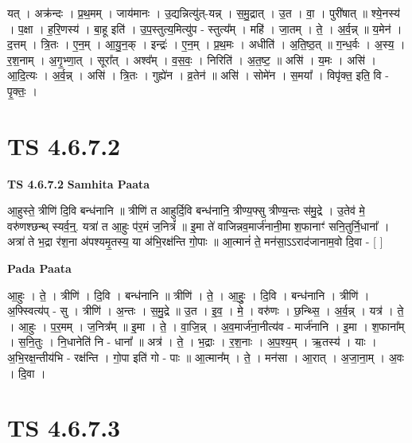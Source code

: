 \documentclass[17pt]{extarticle}
\begin{document}
यत् । अक्र॑न्दः । प्र॒थ॒मम् । जाय॑मानः । उ॒द्यन्नित्यु॑त्-यन्न् । स॒मु॒द्रात् । उ॒त । वा॒ । पुरी॑षात् ॥ श्ये॒नस्य॑ । प॒क्षा । ह॒रि॒णस्य॑ । बा॒हू इति॑ । उ॒प॒स्तुत्य॒मित्यु॑प - स्तुत्य᳚म् । महि॑ । जा॒तम् । ते॒ । अ॒र्व॒न्न् ॥ य॒मेन॑ । द॒त्तम् । त्रि॒तः । ए॒न॒म् । आ॒यु॒न॒क् । इन्द्रः॑ । ए॒न॒म् । प्र॒थ॒मः । अधीति॑ । अ॒ति॒ष्ठ॒त् ॥ ग॒न्ध॒र्वः । अ॒स्य॒ । र॒श॒नाम् । अ॒गृ॒भ्णा॒त् । सूरा᳚त् । अश्व᳚म् । व॒स॒वः॒ । निरिति॑ । अ॒त॒ष्ट॒ ॥ असि॑ । य॒मः । असि॑ । आ॒दि॒त्यः । अ॒र्व॒न्न् । असि॑ । त्रि॒तः । गुह्ये॑न । व्र॒तेन॑ ॥ असि॑ । सोमे॑न । स॒मया᳚ । विपृ॑क्त॒ इति॒ वि - पृ॒क्तः॒ ।  \newline




\section*{ TS 4.6.7.2 }

\textbf{TS 4.6.7.2 } \newline
\textbf{Samhita Paata} \newline

आ॒हुस्ते॒ त्रीणि॑ दि॒वि बन्ध॑नानि ॥ त्रीणि॑ त आहुर्दि॒वि बन्ध॑नानि॒ त्रीण्य॒फ्सु त्रीण्य॒न्तः स॑मु॒द्रे । उ॒तेव॑ मे॒ वरु॑णश्छन्थ् स्यर्व॒न्॒. यत्रा॑ त आ॒हुः प॑र॒मं ज॒नित्रं᳚ ॥ इ॒मा ते॑ वाजिन्नव॒मार्ज॑नानी॒मा श॒फानाꣳ॑ सनि॒तुर्नि॒धाना᳚ । अत्रा॑ ते भ॒द्रा र॑श॒ना अ॑पश्यमृ॒तस्य॒ या अ॑भि॒रक्ष॑न्ति गो॒पाः ॥ आ॒त्मानं॑ ते॒ मन॑सा॒ऽऽराद॑जानाम॒वो दि॒वा - [  ] \newline

\textbf{Pada Paata} \newline

आ॒हुः । ते॒ । त्रीणि॑ । दि॒वि । बन्ध॑नानि ॥ त्रीणि॑ । ते॒ । आ॒हुः॒ । दि॒वि । बन्ध॑नानि । त्रीणि॑ । अ॒फ्स्वित्य॑प् - सु । त्रीणि॑ । अ॒न्तः । स॒मु॒द्रे ॥ उ॒त । इ॒व॒ । मे॒ । वरु॑णः । छ॒न्थ्सि॒ । अ॒र्व॒न्न् । यत्र॑ । ते॒ । आ॒हुः । प॒र॒मम् । ज॒नित्र᳚म् ॥ इ॒मा । ते॒ । वा॒जि॒न्न् । अ॒व॒मार्ज॑ना॒नीत्य॑व - मार्ज॑नानि । इ॒मा । श॒फाना᳚म् । स॒नि॒तुः । नि॒धानेति॑ नि - धाना᳚ ॥ अत्र॑ । ते॒ । भ॒द्राः । र॒श॒नाः । अ॒प॒श्य॒म् । ऋ॒तस्य॑ । याः । अ॒भि॒रक्ष॒न्तीय॑भि - रक्ष॑न्ति । गो॒पा इति॑ गो - पाः ॥ आ॒त्मान᳚म् । ते॒ । मन॑सा । आ॒रात् । अ॒जा॒ना॒म् । अ॒वः । दि॒वा ।  \newline




\section*{ TS 4.6.7.3 }
\end{document}
